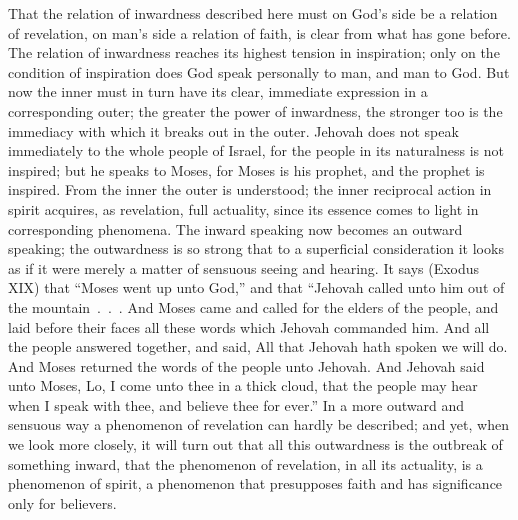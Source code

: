 \documentclass[12pt]{book}
\newcommand{\opage}[1]{\marginnote{\footnotesize\textit{[#1]}}}
\begin{document}
That the relation of inwardness described here must on God's side be a
relation of revelation, on man's side a relation of faith, is clear from
what has gone before. The relation of inwardness reaches its highest
tension in inspiration; only on the condition of inspiration does God
speak personally to man, and man to God. But now the inner must in turn
have its clear, immediate expression in a corresponding outer; the greater
the power of inwardness, the stronger too is the immediacy with which it
breaks out in the outer. Jehovah does not speak
\opage{188}\setcounter{footnote}{0}%
immediately to the whole people of Israel, for the people in its
naturalness is not inspired; but he speaks to Moses, for Moses is his
prophet, and the prophet is inspired. From the inner the outer is
understood; the inner reciprocal action in spirit acquires, as revelation,
full actuality, since its essence comes to light in corresponding
phenomena. The inward speaking now becomes an outward speaking; the
outwardness is so strong that to a superficial consideration it looks as
if it were merely a matter of sensuous seeing and hearing. It says
(Exodus XIX) that ``Moses went up unto God,'' and that ``Jehovah called
unto him out of the mountain~.~.~. And Moses came and called for the
elders of the people, and laid before their faces all these words which
Jehovah commanded him. And all the people answered together, and said, All
that Jehovah hath spoken we will do. And Moses returned the words of the
people unto Jehovah. And Jehovah said unto Moses, Lo, I come unto thee in
a thick cloud, that the people may hear when I speak with thee, and
believe thee for ever.'' In a more outward and sensuous way a phenomenon
of revelation can hardly be described; and yet, when we look more closely,
it will turn out that all this outwardness is the outbreak of something
inward, that the phenomenon of revelation, in all its actuality, is a
phenomenon of spirit, a phenomenon that presupposes faith and has
significance only for believers.
\end{document}
